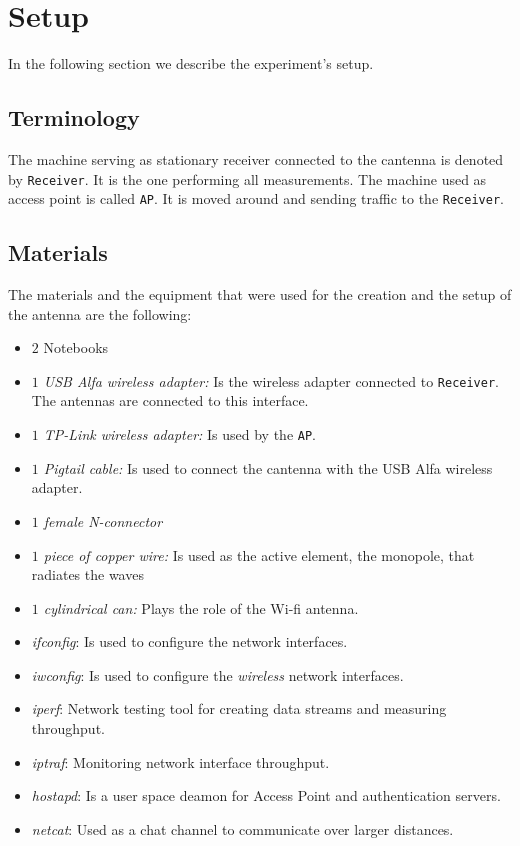 \documentclass[12pt,a4paper]{article}
\newcommand{\rc}[0]{\texttt{Receiver}}
\newcommand{\ap}[0]{\texttt{AP}}
\begin{document}
\section{Setup}	
	In the following section we describe the experiment's setup.
	\subsection{Terminology}
		The machine serving as stationary receiver connected to the cantenna is denoted by \rc. It is the one performing all measurements. The machine used as access point is called \ap. It is moved around and sending traffic to the \rc.
	
	\subsection{Materials}
		The materials and the equipment that were used for the creation and the setup of the antenna are the following: 
		\begin{itemize}
			\item $2$ Notebooks
			\item {\emph{$1$ USB Alfa wireless adapter:} Is the wireless adapter connected to \rc. The antennas are connected to this interface.} 
			\item {\emph{$1$ TP-Link wireless adapter:} Is used by the \ap.}
			\item {\emph{$1$ Pigtail cable:} Is used to connect the cantenna with the USB Alfa wireless adapter.}
			\item {\emph{$1$ female N-connector}}
			\item {\emph{$1$ piece of copper wire:} Is used as the active element, the monopole, that radiates the waves}
			\item {\emph{$1$ cylindrical can:} Plays the role of the Wi-fi antenna.} 
			\item \emph{ifconfig}: Is used to configure the network interfaces.
			\item \emph{iwconfig}: Is used to configure the \emph{wireless} network interfaces.
			\item \emph{iperf}: Network testing tool for creating data streams and measuring throughput.
			\item \emph{iptraf}: Monitoring network interface throughput.
			\item \emph{hostapd}: Is a user space deamon for Access Point and authentication servers.
			\item \emph{netcat}: Used as a chat channel to communicate over larger distances.
		\end{itemize}
	
\end{document}
